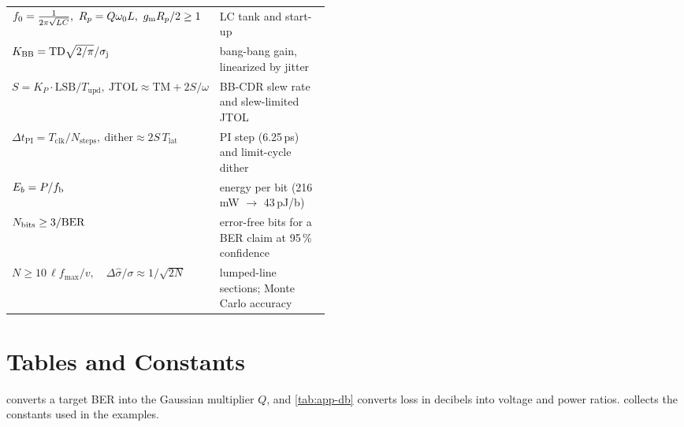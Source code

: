 {\begin{tabularx}{\linewidth}{@{}>{\centering\arraybackslash}p{0.47\linewidth} L@{}}
$f_0=\frac{1}{2\pi\sqrt{LC}},\ R_p=Q\omega_0L,\ g_\mathrm{m} R_p/2\ge1$ & LC tank and start-up\\
$K_\mathrm{BB}=\mathrm{TD}\sqrt{2/\pi}/\sigma_\mathrm{j}$ & bang-bang gain, linearized by jitter\\
$S=K_P\cdot\mathrm{LSB}/T_\mathrm{upd},\ \mathrm{JTOL}\approx\mathrm{TM}+2S/\omega$ & BB-CDR slew rate and slew-limited JTOL\\
$\Delta t_\mathrm{PI}=T_\mathrm{clk}/N_\mathrm{steps},\ \text{dither}\approx2S\,T_\mathrm{lat}$ & PI step (6.25\,ps) and limit-cycle dither\\
$E_b=P/f_\mathrm{b}$ & energy per bit (216\,mW $\to$ 43\,pJ/b)\\
$N_\mathrm{bits}\ge3/\mathrm{BER}$ & error-free bits for a BER claim at 95\,\% confidence\\
$N\ge10\,\ell f_\mathrm{max}/v,\quad\Delta\hat\sigma/\sigma\approx1/\sqrt{2N}$ & lumped-line sections; Monte Carlo accuracy\\
\bottomrule
\end{tabularx}
}

\chapter{Tables and Constants}\label{app:qtable}

 converts a target BER into the Gaussian multiplier $Q$, and \cref{tab:app-db} converts loss in decibels into voltage and power ratios.  collects the constants used in the examples.

